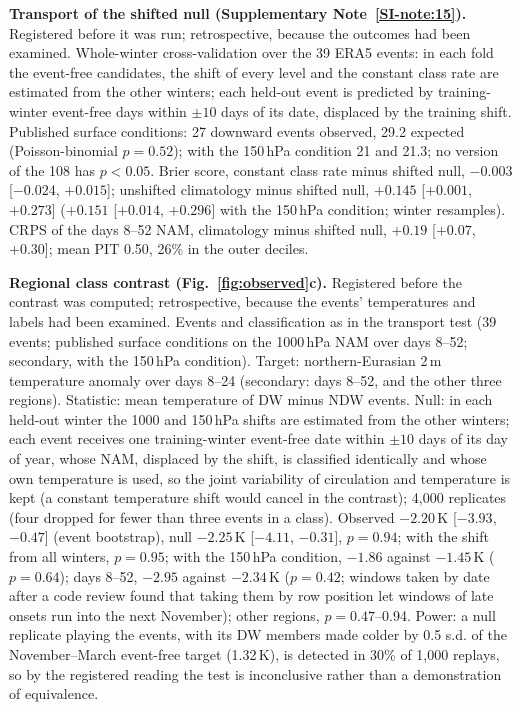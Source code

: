 \documentclass[11pt]{article}
\begin{document}
\textbf{Transport of the shifted null (Supplementary Note~\ref{SI-note:15}).} Registered before it was run; retrospective, because the outcomes had been examined. Whole-winter cross-validation over the 39 ERA5 events: in each fold the event-free candidates, the shift of every level and the constant class rate are estimated from the other winters; each held-out event is predicted by training-winter event-free days within $\pm10$ days of its date, displaced by the training shift. Published surface conditions: 27 downward events observed, 29.2 expected (Poisson-binomial $p = 0.52$); with the 150\,hPa condition 21 and 21.3; no version of the 108 has $p < 0.05.$ Brier score, constant class rate minus shifted null, $-0.003$ [$-0.024$, $+0.015$]; unshifted climatology minus shifted null, $+0.145$ [$+0.001$, $+0.273$] ($+0.151$ [$+0.014$, $+0.296$] with the 150\,hPa condition; winter resamples). CRPS of the days 8–52 NAM, climatology minus shifted null, $+0.19$ [$+0.07$, $+0.30$]; mean PIT 0.50, 26\% in the outer deciles.

\textbf{Regional class contrast (Fig.~\ref{fig:observed}c).} Registered before the contrast was computed; retrospective, because the events' temperatures and labels had been examined. Events and classification as in the transport test (39 events; published surface conditions on the 1000\,hPa NAM over days 8--52; secondary, with the 150\,hPa condition). Target: northern-Eurasian 2\,m temperature anomaly over days 8--24 (secondary: days 8--52, and the other three regions). Statistic: mean temperature of DW minus NDW events. Null: in each held-out winter the 1000 and 150\,hPa shifts are estimated from the other winters; each event receives one training-winter event-free date within $\pm10$ days of its day of year, whose NAM, displaced by the shift, is classified identically and whose own temperature is used, so the joint variability of circulation and temperature is kept (a constant temperature shift would cancel in the contrast); 4,000 replicates (four dropped for fewer than three events in a class). Observed $-2.20$\,K [$-3.93$, $-0.47$] (event bootstrap), null $-2.25$\,K [$-4.11$, $-0.31$], $p = 0.94$; with the shift from all winters, $p = 0.95$; with the 150\,hPa condition, $-1.86$ against $-1.45$\,K ($p = 0.64$); days 8--52, $-2.95$ against $-2.34$\,K ($p = 0.42$; windows taken by date after a code review found that taking them by row position let windows of late onsets run into the next November); other regions, $p = 0.47$--0.94. Power: a null replicate playing the events, with its DW members made colder by 0.5 s.d. of the November--March event-free target (1.32\,K), is detected in 30\% of 1,000 replays, so by the registered reading the test is inconclusive rather than a demonstration of equivalence.
\end{document}
